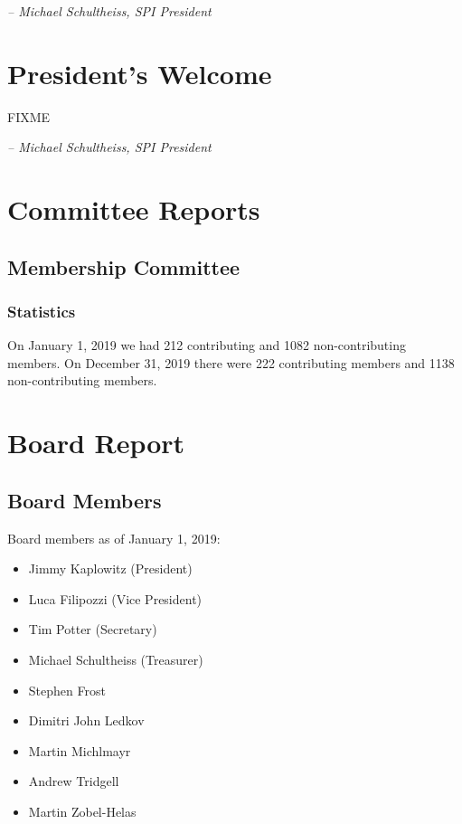 \documentclass[a4paper]{report}
\begin{document}
  \emph{-- Michael Schultheiss, SPI President}

\newpage

\tableofcontents

\newpage

\chapter{President's Welcome}
\label{sec:president}

FIXME

  \emph{-- Michael Schultheiss, SPI President}

\chapter{Committee Reports}
\section{Membership Committee}

\subsection{Statistics}

On January 1, 2019 we had 212 contributing and 1082 non-contributing
members.  On December 31, 2019 there were 222 contributing members and
1138 non-contributing members.

\chapter{Board Report}
\section{Board Members}

Board members as of January 1, 2019:

\begin{itemize}
\item Jimmy Kaplowitz (President)
\item Luca Filipozzi (Vice President)
\item Tim Potter (Secretary)
\item Michael Schultheiss (Treasurer)
\item Stephen Frost
\item Dimitri John Ledkov
\item Martin Michlmayr
\item Andrew Tridgell
\item Martin Zobel-Helas
\end{itemize}
\end{document}
